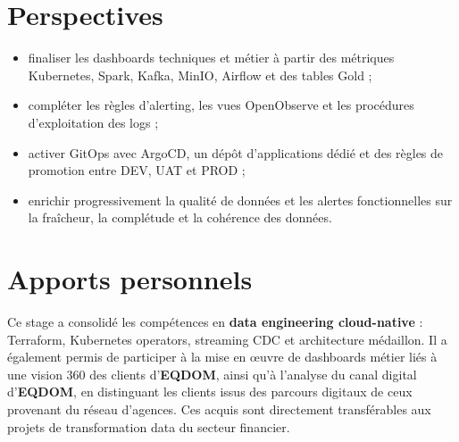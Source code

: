 \section{Perspectives}

\begin{itemize}
    \item finaliser les dashboards techniques et métier à partir des métriques Kubernetes, Spark, Kafka, MinIO, Airflow et des tables Gold ;
    \item compléter les règles d'alerting, les vues OpenObserve et les procédures d'exploitation des logs ;
    \item activer GitOps avec ArgoCD, un dépôt d'applications dédié et des règles de promotion entre DEV, UAT et PROD ;
    \item enrichir progressivement la qualité de données et les alertes fonctionnelles sur la fraîcheur, la complétude et la cohérence des données.
\end{itemize}

\section{Apports personnels}

Ce stage a consolidé les compétences en \textbf{data engineering cloud-native} : Terraform, Kubernetes operators, streaming CDC et architecture médaillon. Il a également permis de participer à la mise en œuvre de dashboards métier liés à une vision 360 des clients d'\textbf{EQDOM}, ainsi qu'à l'analyse du canal digital d'\textbf{EQDOM}, en distinguant les clients issus des parcours digitaux de ceux provenant du réseau d'agences. Ces acquis sont directement transférables aux projets de transformation data du secteur financier.

\vspace{1cm}
\hfill \NomEtudiant

\clearpage
